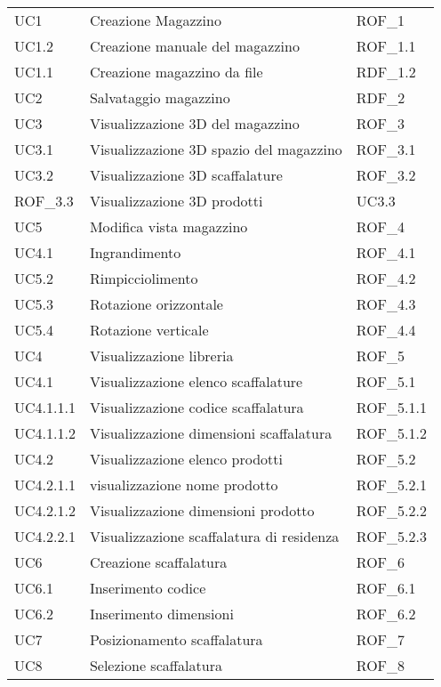 \begin{xltabular}{\textwidth}{ p{0.3\textwidth} | X | p{0.2\textwidth} }
    UC1 & Creazione Magazzino & ROF\_1\\
    UC1.2 & Creazione manuale del magazzino & ROF\_1.1\\
    UC1.1 & Creazione magazzino da file & RDF\_1.2\\
    UC2 & Salvataggio magazzino & RDF\_2\\
    UC3 & Visualizzazione 3D del magazzino & ROF\_3\\
    UC3.1 & Visualizzazione 3D spazio del magazzino & ROF\_3.1\\
    UC3.2 & Visualizzazione 3D scaffalature & ROF\_3.2\\
    ROF\_3.3 & Visualizzazione 3D prodotti & UC3.3\\
    UC5 & Modifica vista magazzino & ROF\_4\\
    UC4.1 & Ingrandimento & ROF\_4.1\\ 
    UC5.2 & Rimpicciolimento & ROF\_4.2\\ 
    UC5.3 & Rotazione orizzontale & ROF\_4.3\\ 
    UC5.4 & Rotazione verticale & ROF\_4.4\\ 
    UC4 & Visualizzazione libreria & ROF\_5\\ 
    UC4.1 & Visualizzazione elenco scaffalature & ROF\_5.1\\ 
    UC4.1.1.1 & Visualizzazione codice scaffalatura & ROF\_5.1.1\\
    UC4.1.1.2 & Visualizzazione dimensioni scaffalatura & ROF\_5.1.2\\
    UC4.2 & Visualizzazione elenco prodotti & ROF\_5.2\\ 
    UC4.2.1.1 & visualizzazione nome prodotto & ROF\_5.2.1\\
    UC4.2.1.2 & Visualizzazione dimensioni prodotto & ROF\_5.2.2\\
    UC4.2.2.1 & Visualizzazione scaffalatura di residenza & ROF\_5.2.3\\ 
    UC6 & Creazione scaffalatura & ROF\_6\\
    UC6.1 & Inserimento codice & ROF\_6.1\\
    UC6.2 & Inserimento dimensioni & ROF\_6.2\\
    UC7 & Posizionamento scaffalatura & ROF\_7\\
    UC8 & Selezione scaffalatura & ROF\_8\\

\end{xltabular}
